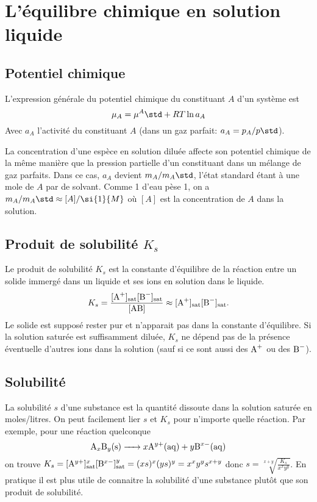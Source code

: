 \section{L'équilibre chimique en solution liquide}
\subsection{Potentiel chimique}
L'expression générale du potentiel chimique du constituant $A$ d'un système est
\[ \mu_A = {\mu^A}\std+RT \ln a_A \]
Avec $a_A$ l'activité du constituant $A$
(dans un gaz parfait: $a_A = p_A/p\std$).

La concentration d'une espèce en solution diluée affecte son potentiel
chimique de la même manière que la pression partielle
d'un constituant dans un mélange de gaz parfaits.
Dans ce cas, $a_A$ devient $m_A/m_A\std$,
l'état standard étant à une mole de $A$ par \kilogram{} de solvant.
Comme \si{1}{\liter} d'eau pèse \si{1}{\kilogram},
on a $m_A/m_A\std \approx [A] / \si{1}{M}$ où $[A]$ est la concentration
de $A$ dans la solution.

\subsection{Produit de solubilité $K_s$}
Le produit de solubilité $K_s$ est la constante d'équilibre
de la réaction entre un solide immergé dans un liquide et
ses ions en solution dans le liquide.
\[ K_s = \frac{[\ce{A^+}]_\mathrm{sat}[\ce{B^-}]_\mathrm{sat}}{[\ce{AB}]}
\approx [\ce{A^+}]_\mathrm{sat}[\ce{B^-}]_\mathrm{sat}. \]
Le solide est supposé rester pur et n'apparait pas dans la constante d'équilibre.
Si la solution saturée est suffisamment diluée,
$K_s$ ne dépend pas de la présence éventuelle d'autres ions dans la solution
(sauf si ce sont aussi des $\ce{A+}$ ou des $\ce{B-}$).

\subsection{Solubilité}
La solubilité $s$ d'une substance est la quantité dissoute
dans la solution saturée en moles/litres.
On peut facilement lier $s$ et $K_s$ pour n'importe quelle réaction.
Par exemple, pour une réaction quelconque
\[ \ce{A}_x\ce{B}_y\ce{(s)} \ce{->}
x\ce{A}^{y+}\ce{(aq)} + y\ce{B}^{x-}\ce{(aq)} \]
on trouve $K_s = [\ce{A}^{y+}]^x_\mathrm{sat}
[\ce{B}^{x-}]^y_\mathrm{sat} = (xs)^x(ys)^y = x^xy^ys^{x+y}$ donc
$s = \sqrt[x+y]{\frac{K_s}{x^xy^y}}$.
En pratique il est plus utile de connaitre la solubilité
d'une substance plutôt que son produit de solubilité.

